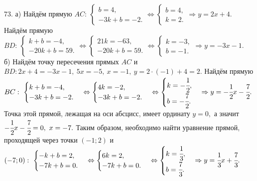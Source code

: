 73. а) Найдём прямую $AC:\ \begin{cases} b=4,\\ -3k+b=-2.\end{cases}\Leftrightarrow\begin{cases} b=4,\\ k=2.\end{cases}\Rightarrow y=2x+4.$
Найдём прямую $BD:\ \begin{cases} k+b=-4,\\ -20k+b=59.\end{cases}\Leftrightarrow\begin{cases} 21k=-63,\\ -20k+b=59.\end{cases}
\Leftrightarrow\begin{cases} k=-3,\\ b=-1.\end{cases}\Rightarrow y=-3x-1.$\\
б) Найдём точку пересечения прямых $AC$ и $BD: 2x+4=-3x-1,\ 5x=-5,\ x=-1,\ y=2\cdot(-1)+4=2.$ Найдём прямую $BC:\ \begin{cases} k+b=-4,\\ -3k+b=-2.\end{cases}\Leftrightarrow\begin{cases} 4k=-2,\\ -3k+b=-2.\end{cases}\Leftrightarrow\begin{cases} k=-\cfrac{1}{2},\\ b=-\cfrac{7}{2}.\end{cases}\Rightarrow y=-\cfrac{1}{2}x-\cfrac{7}{2}.$ Точка этой прямой, лежащая на оси абсцисс, имеет ординату $y=0,$ а значит $-\cfrac{1}{2}x-\cfrac{7}{2}=0,\ x=-7.$ Таким образом, необходимо найти уравнение прямой, проходящей через точки $(-1;2)$ и $(-7;0): \ \begin{cases} -k+b=2,\\ -7k+b=0.\end{cases}\Leftrightarrow\begin{cases} 6k=2,\\ -7k+b=0.\end{cases}\Leftrightarrow\begin{cases} k=\cfrac{1}{3},\\ b=\cfrac{7}{3}.\end{cases}\Rightarrow y=\cfrac{1}{3}x+\cfrac{7}{3}.$\\
